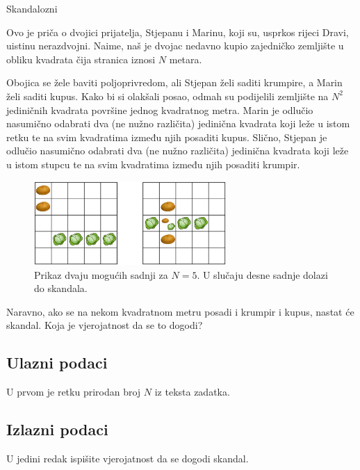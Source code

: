 \begin{statement}[
  problempoints=100,
  timelimit=1 sekunda,
  memorylimit=512 MiB,
]{Skandalozni}

Ovo je priča o dvojici prijatelja, Stjepanu i Marinu, koji su, usprkos
rijeci Dravi, uistinu nerazdvojni. Naime, naš je dvojac nedavno kupio
zajedničko zemljište u obliku kvadrata čija stranica iznosi $N$ metara.

Obojica se žele baviti poljoprivredom, ali Stjepan želi saditi krumpire, a
Marin želi saditi kupus. Kako bi si olakšali posao, odmah su podijelili
zemljište na $N^2$ jediničnih kvadrata površine jednog kvadratnog metra.
Marin je odlučio nasumično odabrati dva (ne nužno različita) jedinična
kvadrata koji leže u istom retku te na svim kvadratima između njih posaditi
kupus.  Slično, Stjepan je odlučio nasumično odabrati dva (ne nužno
različita) jedinična kvadrata koji leže u istom stupcu te na svim kvadratima
između njih posaditi krumpir.

\begin{figure}[H]
\centering
\includegraphics[width=0.65\textwidth]{img/skandal_skica.png}
\caption*{Prikaz dvaju mogućih sadnji za $N=5$. U slučaju desne sadnje dolazi do skandala.}
\end{figure}
\vspace{-0.5cm}

Naravno, ako se na nekom kvadratnom metru posadi i krumpir i kupus, nastat će
skandal. Koja je vjerojatnost da se to dogodi?

\subsection*{Ulazni podaci}
U prvom je retku prirodan broj $N$ iz teksta zadatka.

\subsection*{Izlazni podaci}
U jedini redak ispišite vjerojatnost da se dogodi skandal.


\end{statement}
